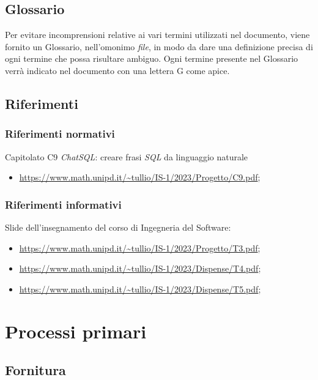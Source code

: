 \documentclass[5pt]{article}
\begin{document}
\subsection{Glossario}
Per evitare incomprensioni relative ai vari termini utilizzati nel documento, viene fornito un Glossario, nell'omonimo \textit{file}, in modo da dare una definizione precisa di ogni termine che possa risultare ambiguo. Ogni termine presente nel Glossario verrà indicato nel documento con una lettera G come apice.

\subsection{Riferimenti}
\subsubsection{Riferimenti normativi}
Capitolato C9 \textit{ChatSQL}: creare frasi \textit{SQL} da linguaggio naturale
\begin{itemize}
    \item \url{https://www.math.unipd.it/~tullio/IS-1/2023/Progetto/C9.pdf};
\end{itemize}

\subsubsection{Riferimenti informativi}
Slide dell’insegnamento del corso di Ingegneria del Software:
\begin{itemize}
\item \url{https://www.math.unipd.it/~tullio/IS-1/2023/Progetto/T3.pdf};
\item \url{https://www.math.unipd.it/~tullio/IS-1/2023/Dispense/T4.pdf};
\item \url{https://www.math.unipd.it/~tullio/IS-1/2023/Dispense/T5.pdf};
\end{itemize}

\section{Processi primari}
\subsection{Fornitura}
\end{document}
